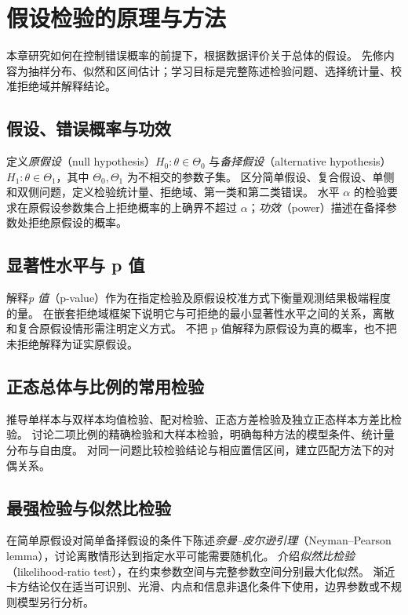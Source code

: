 \setcounter{chapter}{13} %
\chapter{假设检验的原理与方法}
\label{chap:ps-testing}

本章研究如何在控制错误概率的前提下，根据数据评价关于总体的假设。
先修内容为抽样分布、似然和区间估计；学习目标是完整陈述检验问题、选择统计量、校准拒绝域并解释结论。

\section{假设、错误概率与功效}
\label{sec:ps-testing-framework}
定义\emph{原假设}（null hypothesis）$H_0:\theta\in\Theta_0$ 与\emph{备择假设}（alternative hypothesis）$H_1:\theta\in\Theta_1$，其中 $\Theta_0,\Theta_1$ 为不相交的参数子集。
区分简单假设、复合假设、单侧和双侧问题，定义检验统计量、拒绝域、第一类和第二类错误。
水平 $\alpha$ 的检验要求在原假设参数集合上拒绝概率的上确界不超过 $\alpha$；\emph{功效}（power）描述在备择参数处拒绝原假设的概率。

\section{显著性水平与 p 值}
\label{sec:ps-p-values}
解释\emph{p 值}（p-value）作为在指定检验及原假设校准方式下衡量观测结果极端程度的量。
在嵌套拒绝域框架下说明它与可拒绝的最小显著性水平之间的关系，离散和复合原假设情形需注明定义方式。
不把 p 值解释为原假设为真的概率，也不把未拒绝解释为证实原假设。

\section{正态总体与比例的常用检验}
\label{sec:ps-classical-tests}
推导单样本与双样本均值检验、配对检验、正态方差检验及独立正态样本方差比检验。
讨论二项比例的精确检验和大样本检验，明确每种方法的模型条件、统计量分布与自由度。
对同一问题比较检验结论与相应置信区间，建立匹配方法下的对偶关系。

\section{最强检验与似然比检验}
\label{sec:ps-likelihood-ratio-tests}
在简单原假设对简单备择假设的条件下陈述\emph{奈曼--皮尔逊引理}（Neyman--Pearson lemma），讨论离散情形达到指定水平可能需要随机化。
介绍\emph{似然比检验}（likelihood-ratio test），在约束参数空间与完整参数空间分别最大化似然。
渐近卡方结论仅在适当可识别、光滑、内点和信息非退化条件下使用，边界参数或不规则模型另行分析。

